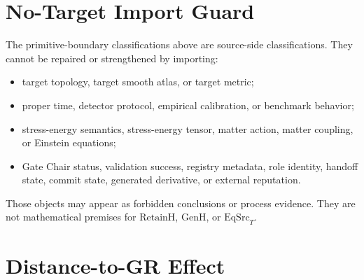 \documentclass[11pt]{article}
\newcommand{\EqSrcT}{\mathrm{EqSrc}_{T}}
\newcommand{\RetainH}{\mathrm{RetainH}}
\newcommand{\GenH}{\mathrm{GenH}}
\begin{document}
\section{No-Target Import Guard}

The primitive-boundary classifications above are source-side classifications.
They cannot be repaired or strengthened by importing:
\begin{itemize}[leftmargin=*]
  \item target topology, target smooth atlas, or target metric;
  \item proper time, detector protocol, empirical calibration, or benchmark behavior;
  \item stress-energy semantics, stress-energy tensor, matter action, matter coupling, or Einstein equations;
  \item Gate Chair status, validation success, registry metadata, role identity, handoff state, commit state, generated derivative, or external reputation.
\end{itemize}

Those objects may appear as forbidden conclusions or process evidence. They
are not mathematical premises for \(\RetainH\), \(\GenH\), or \(\EqSrcT\).

\section{Distance-to-GR Effect}
\end{document}

